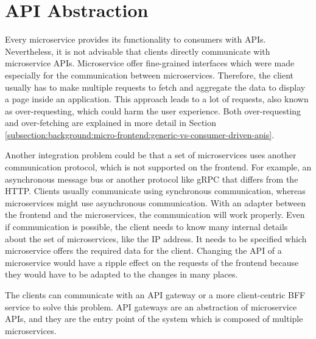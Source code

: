 \section{API Abstraction}\label{section:background:api-abstraction}

Every microservice provides its functionality to consumers with \acp{API}. Nevertheless, it is not advisable that clients directly communicate with microservice \acp{API}. Microservice offer fine-grained interfaces which were made especially for the communication between microservices. Therefore, the client usually has to make multiple requests to fetch and aggregate the data to display a page inside an application. \cite[69]{book:2021:newman:background:bff:micro-services} This approach leads to a lot of requests, also known as over-requesting, which could harm the user experience. \cite[254, 257]{book:2018:richardson:background:bff:microservices-patterns} Both over-requesting and over-fetching are explained in more detail in Section \ref{subsection:background:micro-frontend:generic-vs-consumer-driven-apis}.

\bigskip

\noindent Another integration problem could be that a set of microservices uses another communication protocol, which is not supported on the frontend. For example, an asynchronous message bus or another protocol like \ac{gRPC} that differs from the \ac{HTTP}. Clients usually communicate using synchronous communication, whereas microservices might use asynchronous communication. With an adapter between the frontend and the microservices, the communication will work properly. Even if communication is possible, the client needs to know many internal details about the set of microservices, like the \ac{IP} address. It needs to be specified which microservice offers the required data for the client. Changing the \ac{API} of a microservice would have a ripple effect on the requests of the frontend because they would have to be adapted to the changes in many places. \cite[254-257]{book:2018:richardson:background:bff:microservices-patterns}

\bigskip

\noindent The clients can communicate with an \ac{API} gateway or a more client-centric \ac{BFF} service to solve this problem. \ac{API} gateways are an abstraction of microservice \acp{API}, and they are the entry point of the system which is composed of multiple microservices. \cite[19-20]{book:2020:siriwardena:background:bff:microservice-security-in-action}

